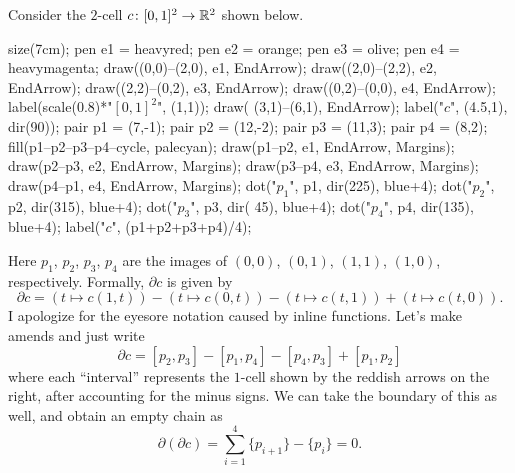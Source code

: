 \begin{example}
	Consider the $2$-cell $c \colon [0,1]^2 \to \mathbb R^2$ shown below.
	\begin{center}
		\begin{asy}
			size(7cm);
			pen e1 = heavyred;
			pen e2 = orange;
			pen e3 = olive;
			pen e4 = heavymagenta;
			draw((0,0)--(2,0), e1, EndArrow);
			draw((2,0)--(2,2), e2, EndArrow);
			draw((2,2)--(0,2), e3, EndArrow);
			draw((0,2)--(0,0), e4, EndArrow);
			label(scale(0.8)*"$[0,1]^2$", (1,1));
			draw( (3,1)--(6,1), EndArrow);
			label("$c$", (4.5,1), dir(90));
			pair p1 = (7,-1);
			pair p2 = (12,-2);
			pair p3 = (11,3);
			pair p4 = (8,2);
			fill(p1--p2--p3--p4--cycle, palecyan);
			draw(p1--p2, e1, EndArrow, Margins);
			draw(p2--p3, e2, EndArrow, Margins);
			draw(p3--p4, e3, EndArrow, Margins);
			draw(p4--p1, e4, EndArrow, Margins);
			dot("$p_1$", p1, dir(225), blue+4);
			dot("$p_2$", p2, dir(315), blue+4);
			dot("$p_3$", p3, dir( 45), blue+4);
			dot("$p_4$", p4, dir(135), blue+4);
			label("$c$", (p1+p2+p3+p4)/4);
		\end{asy}
	\end{center}
	Here $p_1$, $p_2$, $p_3$, $p_4$ are the images of $(0,0)$, $(0,1)$, $(1,1)$, $(1,0)$, respectively.
	Formally, $\partial c$ is given by
	\[ \partial c = (t \mapsto c(1,t)) - (t \mapsto c(0,t))
		- (t \mapsto c(t,1)) + (t \mapsto c(t,0)). \]
	I apologize for the eyesore notation caused by inline functions.
	Let's make amends and just write
	\[ \partial c = [p_2,p_3] - [p_1,p_4] - [p_4,p_3] + [p_1,p_2] \]
	where each ``interval'' represents the $1$-cell shown by the reddish arrows on the right,
	after accounting for the minus signs.
	We can take the boundary of this as well, and obtain an empty chain as
	\[ \partial(\partial c) = \sum_{i=1}^4 \{p_{i+1}\}-\{p_i\} = 0. \]
\end{example}

